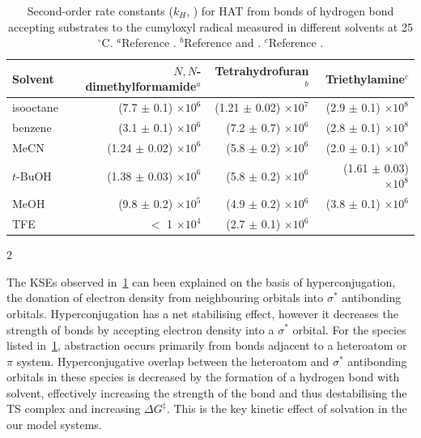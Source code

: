\begin{table}[htb]
{\footnotesize
\centering
  \begin{tabular}{l r r r}
    Solvent & $N,N$-dimethylformamide$^a$ & Tetrahydrofuran$^b$ & Triethylamine$^c$ \\
\toprule
\toprule
    isooctane & (7.7 $\pm$ 0.1) $\times 10^6$ & (1.21 $\pm$ 0.02) $\times 10^7$ & \rule{0pt}{3ex} (2.9 $\pm$ 0.1) $\times 10^8$  \\
    benzene & (3.1 $\pm$ 0.1) $\times 10^6$ & (7.2 $\pm$ 0.7) $\times 10^6$ & (2.8 $\pm$ 0.1) $\times 10^8$ \\
    MeCN & (1.24 $\pm$ 0.02) $\times 10^6$ & (5.8 $\pm$ 0.2) $\times 10^6$ & (2.0 $\pm$ 0.1) $\times 10^8$ \\
    $t$-BuOH & (1.38 $\pm$ 0.03) $\times 10^6$ & (5.8 $\pm$ 0.2) $\times 10^6$ & (1.61 $\pm$ 0.03) $\times 10^8$ \\
    MeOH & (9.8 $\pm$ 0.2) $\times 10^5$ & (4.9 $\pm$ 0.2) $\times 10^6$ & (3.8 $\pm$ 0.1) $\times 10^6$ \\
    TFE & $<$ 1 $\times 10^4$ & (2.7 $\pm$ 0.1) $\times 10^6$ & \\
  \end{tabular}
  \caption[Summary of second-order rate constants for HAT from  bonds for
  hydrogen bond accepting substrates from the cumyloxyl radical.]{Second-order
    rate constants ($k_H$, \Ms) for HAT from  bonds of hydrogen bond
    accepting substrates to the cumyloxyl radical measured in different
    solvents at 25 $^{\circ}$C. $^a$Reference
    . $^b$Reference  and
    . $^c$Reference .}
2\label{tab:kse}
}
\end{table}


The KSEs observed in~\ref{tab:kse} can been explained on the basis of
hyperconjugation, the donation of electron density from neighbouring orbitals
into  $\sigma^*$ antibonding orbitals. Hyperconjugation has a net stabilising
effect, however it decreases the strength of  bonds by accepting electron
density into a  $\sigma^*$ orbital. For the species listed in~\ref{tab:kse},
abstraction occurs primarily from  bonds adjacent to a heteroatom or $\pi$
system. Hyperconjugative overlap between the heteroatom and  $\sigma^*$
antibonding orbitals in these species is decreased by the formation of a
hydrogen bond with solvent, effectively increasing the strength of the  bond
and thus destabilising the TS complex and increasing $\Delta G^{\ddagger}$. This
is the key kinetic effect of solvation in the our model systems.


